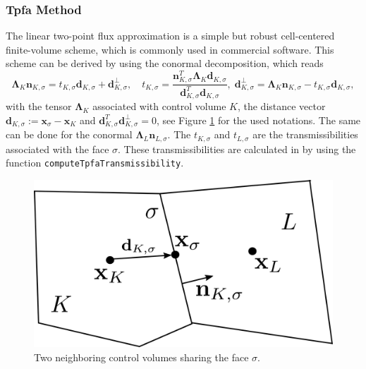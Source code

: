 \subsubsection{Tpfa Method}\label{cc_tpfa}
The linear two-point flux approximation is a simple but robust cell-centered finite-volume scheme, which is commonly used in commercial software. 
This scheme can be derived by using the conormal decomposition, which reads
\begin{equation}
\mathbf{\Lambda}_K \mathbf{n}_{K, \sigma} = t_{K,\sigma} \mathbf{d}_{K,\sigma} + \mathbf{d}^{\bot}_{K,\sigma}, \quad  t_{K,\sigma} = \frac{\mathbf{n}_{K, \sigma}^T \mathbf{\Lambda}_K \mathbf{d}_{K,\sigma} }{\mathbf{d}_{K,\sigma}^T \mathbf{d}_{K,\sigma}}, \; \mathbf{d}^{\bot}_{K,\sigma} = \mathbf{\Lambda}_K \mathbf{n}_{K, \sigma} - t_{K,\sigma} \mathbf{d}_{K,\sigma},
\label{eq:conormalDecTpfa}
\end{equation}
with the tensor $\mathbf{\Lambda}_K$ associated with control volume $K$, the distance vector $\mathbf{d}_{K,\sigma} := \mathbf{x}_\sigma - \mathbf{x}_K$ and $\mathbf{d}_{K,\sigma}^T \mathbf{d}^{\bot}_{K,\sigma} = 0$, see Figure \ref{pc:cctpfa} for the used notations. The same can be done for the conormal $\mathbf{\Lambda}_L \mathbf{n}_{L, \sigma}$. The $t_{K,\sigma}$ and $t_{L,\sigma}$ are the transmissibilities associated with the face $\sigma$. These transmissibilities are calculated in \Dumux by using the function \texttt{computeTpfaTransmissibility}.

\begin{figure} [ht]
\centering
\includegraphics[width=0.4\linewidth,keepaspectratio]{PNG/cctpfa.png}
\caption{Two neighboring control volumes sharing the face $\sigma$.}
\label{pc:cctpfa}
\end{figure}


